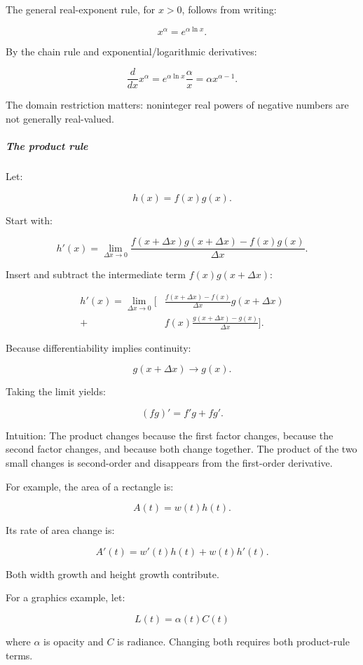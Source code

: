 The general real-exponent rule, for \(x>0\), follows from writing:

\[
x^\alpha=e^{\alpha\ln x}.
\]

By the chain rule and exponential/logarithmic derivatives:

\[
\frac d{dx}x^\alpha =e^{\alpha\ln x}\frac{\alpha}{x} =\alpha x^{\alpha-1}.
\]

The domain restriction matters: noninteger real powers of negative numbers are not generally real-valued.

\subparagraph{The product rule}\label{01-foundations-i-ch020-the-product-rule}

\hypertarget{01-foundations-i-ch020-the-product-rule}{}

Let:

\[
h(x)=f(x)g(x).
\]

Start with:

\[
h'(x)= \lim_{\Delta x\to0} \frac{f(x+\Delta x)g(x+\Delta x)-f(x)g(x)}{\Delta x}.
\]

Insert and subtract the intermediate term \(f(x)g(x+\Delta x)\):

\[
\begin{aligned} h'(x)=\lim_{\Delta x\to0} \bigg[ &\frac{f(x+\Delta x)-f(x)}{\Delta x}g(x+\Delta x)\\ +{}&f(x)\frac{g(x+\Delta x)-g(x)}{\Delta x} \bigg]. \end{aligned}
\]

Because differentiability implies continuity:

\[
g(x+\Delta x)\to g(x).
\]

Taking the limit yields:

\[
\boxed{(fg)'=f'g+fg'}.
\]

Intuition: The product changes because the first factor changes, because the second factor changes, and because both change together. The product of the two small changes is second-order and disappears from the first-order derivative.

For example, the area of a rectangle is:

\[
A(t)=w(t)h(t).
\]

Its rate of area change is:

\[
A'(t)=w'(t)h(t)+w(t)h'(t).
\]

Both width growth and height growth contribute.

For a graphics example, let:

\[
L(t)=\alpha(t)C(t)
\]

where \(\alpha\) is opacity and \(C\) is radiance. Changing both requires both product-rule terms.

